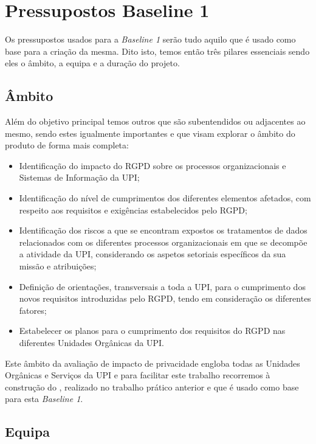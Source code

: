 \section{Pressupostos Baseline 1}

Os pressupostos usados para a \emph{Baseline 1} serão tudo aquilo que é usado como base para a criação da mesma. Dito isto, temos então três pilares essenciais sendo eles o âmbito, a equipa e a duração do projeto.

\subsection{Âmbito}
Além do objetivo principal temos outros que são subentendidos ou adjacentes ao mesmo, sendo estes igualmente importantes e que visam explorar o âmbito do produto de forma mais completa:

\begin{itemize}
    \item Identificação do impacto do RGPD sobre os processos organizacionais e Sistemas de Informação da UPI;
    \item Identificação do nível de cumprimentos dos diferentes elementos afetados, com respeito aos requisitos e exigências estabelecidos pelo RGPD;
    \item Identificação dos riscos a que se encontram expostos os tratamentos de dados relacionados com os diferentes processos organizacionais em que se decompõe a atividade da UPI, considerando os aspetos setoriais específicos da sua missão e atribuições;
    \item Definição de orientações, transversais a toda a UPI, para o cumprimento dos novos requisitos introduzidas pelo RGPD, tendo em consideração os diferentes fatores;
    \item Estabelecer os planos para o cumprimento dos requisitos do RGPD nas diferentes Unidades Orgânicas da UPI.
\end{itemize}


Este âmbito da avaliação de impacto de privacidade engloba todas as Unidades Orgânicas e Serviços da UPI e para facilitar este trabalho recorremos à construção do , realizado no trabalho prático anterior e que é usado como base para esta \emph{Baseline 1}.


\subsection{Equipa}


